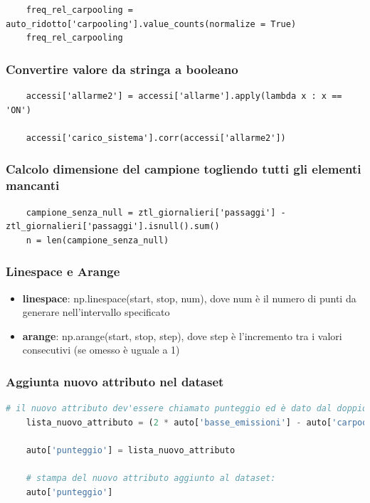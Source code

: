 \documentclass{article}
\begin{document}
\begin{lstlisting}
    freq_rel_carpooling = auto_ridotto['carpooling'].value_counts(normalize = True)
    freq_rel_carpooling
\end{lstlisting}

\subsubsection*{Convertire valore da stringa a booleano}

\begin{lstlisting}
    accessi['allarme2'] = accessi['allarme'].apply(lambda x : x == 'ON')

    accessi['carico_sistema'].corr(accessi['allarme2'])
\end{lstlisting}

\subsubsection*{Calcolo dimensione del campione togliendo tutti gli elementi mancanti}

\begin{lstlisting}
    campione_senza_null = ztl_giornalieri['passaggi'] - ztl_giornalieri['passaggi'].isnull().sum()
    n = len(campione_senza_null)
\end{lstlisting}

\subsubsection*{Linespace e Arange}

\begin{itemize}
    \item \textbf{linespace}: np.linespace(start, stop, num), dove num è il numero di punti da generare nell'intervallo specificato
    \item \textbf{arange}: np.arange(start, stop, step), dove step è l'incremento tra i valori consecutivi (se omesso è uguale a 1)
\end{itemize}

\subsubsection*{Aggiunta nuovo attributo nel dataset}

\begin{lstlisting}[language=Python]
    # il nuovo attributo dev'essere chiamato punteggio ed è dato dal doppio delle basse emissioni - carpooling:
    lista_nuovo_attributo = (2 * auto['basse_emissioni'] - auto['carpooling'].to_numpy())

    auto['punteggio'] = lista_nuovo_attributo

    # stampa del nuovo attributo aggiunto al dataset:
    auto['punteggio']
\end{lstlisting}
\end{document}

